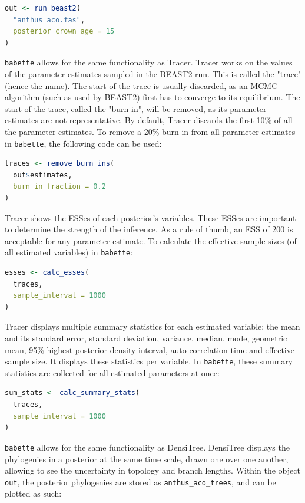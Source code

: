 \documentclass{article}
\begin{document}
\begin{lstlisting}[language=R, floatplacement=H]
out <- run_beast2(
  "anthus_aco.fas",
  posterior_crown_age = 15
)
\end{lstlisting}
\verb;babette; allows for the same functionality as Tracer.
Tracer works on the values of the parameter estimates sampled
in the BEAST2 run. This is called the "trace" (hence the name).
The start of the trace is usually discarded, as an MCMC 
algorithm (such as used by BEAST2) first has to converge to
its equilibrium. The start of the trace, called the "burn-in", 
will be removed, as its parameter estimates are not 
representative. By default, Tracer discards the first 10\% of all 
the parameter estimates. 
To remove a 20\% burn-in from all parameter estimates 
in \verb;babette;, the following code can be used:

\begin{lstlisting}[language=R, floatplacement=H]
traces <- remove_burn_ins(
  out$estimates, 
  burn_in_fraction = 0.2
)
\end{lstlisting}
Tracer shows the ESSes of each posterior's variables.
These ESSes are important to determine the strength of the
inference. As a rule of thumb, an ESS of 200 is acceptable 
for any parameter estimate.
To calculate the effective sample sizes (of all estimated variables) in \verb;babette;:

\begin{lstlisting}[language=R, floatplacement=H]
esses <- calc_esses(
  traces, 
  sample_interval = 1000
)
\end{lstlisting}
Tracer displays multiple summary statistics for each
estimated variable: the mean and its standard error, standard deviation,
variance, median, mode, geometric mean, 95\% highest posterior density interval, 
auto-correlation time and effective sample size. It displays these statistics per
variable. In \verb;babette;, these summary statistics are collected for
all estimated parameters at once: 

\begin{lstlisting}[language=R, floatplacement=H]
sum_stats <- calc_summary_stats(
  traces, 
  sample_interval = 1000
)
\end{lstlisting}
\verb;babette; allows for the same functionality as DensiTree.
DensiTree displays the phylogenies in a posterior at the same
time scale, drawn one over one another, allowing to see the uncertainty in
topology and branch lengths. Within the object \verb;out;, 
the posterior phylogenies are stored as \verb;anthus_aco_trees;,
and can be plotted as such:
\end{document}
